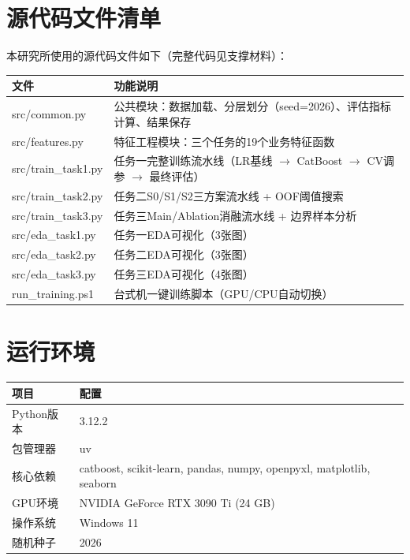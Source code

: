 \section{源代码文件清单}

本研究所使用的源代码文件如下（完整代码见支撑材料）：

\begin{table}[H]
\centering
\begin{tabular}{lp{7cm}}
\toprule
\textbf{文件} & \textbf{功能说明} \\
\midrule
src/common.py & 公共模块：数据加载、分层划分（seed=2026）、评估指标计算、结果保存 \\
src/features.py & 特征工程模块：三个任务的19个业务特征函数 \\
src/train\_task1.py & 任务一完整训练流水线（LR基线 $\to$ CatBoost $\to$ CV调参 $\to$ 最终评估） \\
src/train\_task2.py & 任务二S0/S1/S2三方案流水线 + OOF阈值搜索 \\
src/train\_task3.py & 任务三Main/Ablation消融流水线 + 边界样本分析 \\
src/eda\_task1.py & 任务一EDA可视化（3张图） \\
src/eda\_task2.py & 任务二EDA可视化（3张图） \\
src/eda\_task3.py & 任务三EDA可视化（4张图） \\
run\_training.ps1 & 台式机一键训练脚本（GPU/CPU自动切换） \\
\bottomrule
\end{tabular}
\end{table}

\section{运行环境}

\begin{table}[H]
\centering
\begin{tabular}{ll}
\toprule
\textbf{项目} & \textbf{配置} \\
\midrule
Python版本 & 3.12.2 \\
包管理器 & uv \\
核心依赖 & catboost, scikit-learn, pandas, numpy, openpyxl, matplotlib, seaborn \\
GPU环境 & NVIDIA GeForce RTX 3090 Ti (24 GB) \\
操作系统 & Windows 11 \\
随机种子 & 2026 \\
\bottomrule
\end{tabular}
\end{table}

